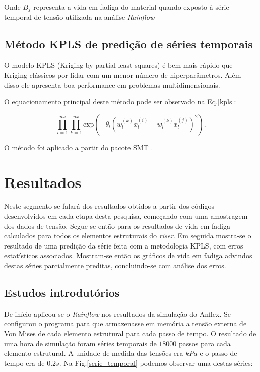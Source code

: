 Onde $B_f$ representa a vida em fadiga do material quando exposto à série  temporal de tensão utilizada na análise \emph{Rainflow}

\subsection{Método KPLS de predição de séries temporais}

O modelo KPLS (Kriging by partial least squares) é bem mais rápido que Kriging clássicos por lidar com um menor número de hiperparâmetros. Além disso ele apresenta boa performance em problemas multidimensionais. 

O equacionamento principal deste método pode ser observado na Eq.\ref{kpls}:
    
\begin{equation}\label{kpls}
    \prod^{nx}_{l=1} \prod^{nx}_{k=1} \text{exp} \left( -\theta_l(w_l^{(k)} x_l^{(i)} - w_l^{(k)} x_l^{(j)} )^2\right).
\end{equation}

O método foi aplicado a partir do pacote SMT \cite{BOUHLEL2019}.

\section{Resultados}

Neste segmento se falará dos resultados obtidos a partir dos códigos desenvolvidos em cada etapa desta pesquisa, começando com uma amostragem dos dados de tensão. Segue-se então para os resultados de vida em fadiga calculados para todos os elementos estruturais do \emph{riser}. Em seguida mostra-se o resultado de uma predição da série feita com a metodologia KPLS, com erros estatísticos associados. Mostram-se então os gráficos de vida em fadiga advindos destas séries parcialmente preditas, concluindo-se com análise dos erros.

\subsection{Estudos introdutórios}

De início aplicou-se o \emph{Rainflow} nos resultados da simulação do Anflex. Se configurou o programa para que armazenasse em memória a tensão externa de Von Mises de cada elemento estrutural para cada passo de tempo. O resultado de uma hora de simulação foram séries temporais de $18000$ passos para cada elemento estrutural. A unidade de medida das tensões era $kPa$ e o passo de tempo era de $0.2 s$. Na Fig.\ref{serie_temporal} podemos observar uma destas séries:

